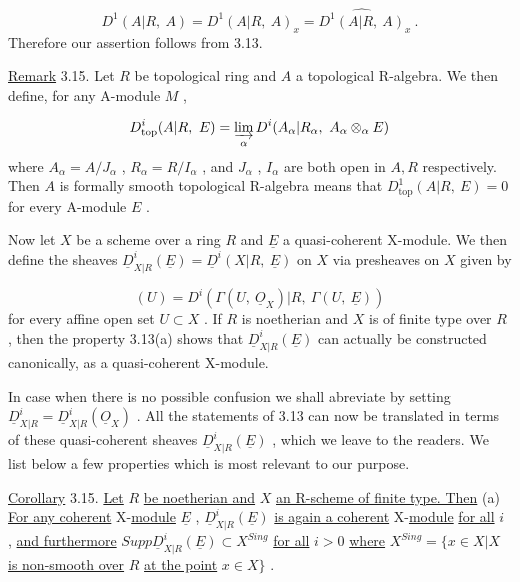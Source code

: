 \begin{equation*}
D^1(A|R,\ A) = D^1(A|R,\ A)_x = \widehat{D^1(A|R,\ A)}_x\ .
\end{equation*}
Therefore our assertion follows from 3.13.

\underline{Remark} 3.15.  Let  $R$  be topological ring and  $A$  a topological R-algebra. We then define, for any A-module  $M$  ,

\begin{equation*}
D^i_{\mathrm{top}}(A|R,\ E) = \varinjlim_{\alpha} D^i(A_\alpha|R_\alpha,\ A_\alpha \otimes_\alpha E)
\end{equation*}
where  $A_\alpha = A/J_\alpha$ , $R_\alpha = R/I_\alpha$  , and  $J_\alpha$ , $I_\alpha$  are both open in  $A, R$  respectively. Then  $A$  is formally smooth topological R-algebra means that  $D^1_{\mathrm{top}}(A|R,\ E) = 0$  for every A-module  $E$  .

        Now let  $X$  be a scheme over a ring  $R$  and  $\underline{E}$  a quasi-coherent  X-module. We then define the sheaves  $\underline{D}^i_{X|R}(\underline{E}) = \underline{D}^i(X|R,\ \underline{E})$  on  $X$  via presheaves on  $X$  given by

\begin{equation*}
[\underline{D}^i_{X|R}(\underline{E})](U) = D^i(\Gamma(U,\ \underline{O}_X)|R,\ \Gamma(U,\ \underline{E}))
\end{equation*}
for every affine open set  $U \subset X$  . If  $R$  is noetherian and  $X$  is of finite type over  $R$  , then the property 3.13(a) shows that  $\underline{D}^i_{X|R}(\underline{E})$  can actually be constructed canonically, as a quasi-coherent X-module.

        In case when there is no possible confusion we shall abreviate by setting  $\underline{D}^i_{X|R} = \underline{D}^i_{X|R}(\underline{O}_X)$  . All the statements of 3.13 can now be translated in terms of these quasi-coherent sheaves  $\underline{D}^i_{X|R}(\underline{E})$  , which we leave to the readers. We list below a few properties which is most relevant to our purpose.

\underline{Corollary} 3.15. \underline{Let}  $R$  \underline{be noetherian and}  $X$  \underline{an R-scheme of finite type. Then}
(a)  \underline{For any coherent} X-\underline{module}  $\underline{E}$ , $\underline{D}^i_{X|R}(\underline{E})$  \underline{is again a coherent} X-\underline{module} \underline{for all}  $i$ , \underline{and furthermore}  $Supp \underline{D}^i_{X|R}(\underline{E}) \subset X^{Sing}$  \underline{for all}  $i > 0$  \underline{where} $X^{Sing} = \{x \in X| X$ \underline{is non-smooth over}  $R$  \underline{at the point}  $x \in X\}$ .

